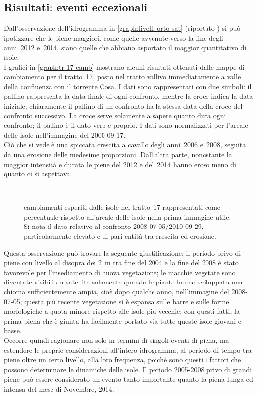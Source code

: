 \subsection{Risultati: eventi eccezionali}
Dall'osservazione dell'idrogramma in \vref{graph:livelli-orto-sat} (riportato ) si può ipotizzare che le piene maggiori, come quelle avvenute verso la fine degli anni~2012 e~2014, siano quelle che abbiano asportato il maggior quantitativo di isole.
\\
I grafici in \vref{graph:tr-17-camb} mostrano alcuni risultati ottenuti dalle mappe di cambiamento per il tratto~17, posto nel tratto vallivo immediatamente a valle della confluenza con il torrente Cosa.
I dati sono rappresentati con due simboli: il pallino rappresenta la data finale di ogni confronto, mentre la croce indica la data iniziale; 
chiaramente il pallino di un confronto ha la stessa data della croce del confronto successivo. 
La croce serve solamente a sapere quanto dura ogni confronto; il pallino è il dato vero e proprio.
I dati sono normalizzati per l'areale delle isole nell'immagine \AST{} del 2000-09-17.
\\
Ciò che si vede è una spiccata crescita a cavallo degli anni~2006 e~2008, seguita da una erosione delle medesime proporzioni.
Dall'altra parte, nonostante la maggior intensità e durata le piene del 2012 e del~2014 hanno eroso meno di quanto ci si aspettava.
%
\begin{figure}
	\centering
	
	\\
	
	\caption[cambiamenti esperiti dalle isole nel tratto~17]{cambiamenti esperiti dalle isole nel tratto~17 rappresentati come percentuale rispetto all'areale delle isole nella prima immagine utile. 
	Si nota il dato relativo al confronto 2008-07-05/2010-09-29, particolarmente elevato e di pari entità tra crescita ed erosione.}
	\label{graph:tr-17-camb}
\end{figure}
%
Questa osservazione può trovare la seguente giustificazione: il periodo privo di piene con livello al disopra dei \SI{2}{\m} tra fine del 2004 e la fine del 2008 è stato favorevole per l'insediamento di nuova vegetazione;
le macchie vegetate sono diventate visibili da satellite solamente quando le piante hanno sviluppato una chioma sufficientemente ampia, cioè dopo qualche anno, nell'immagine del 2008-07-05;
questa più recente vegetazione si è espansa sulle barre e sulle forme morfologiche a quota minore rispetto alle isole più vecchie;
con questi fatti, la prima piena che è giunta ha facilmente portato via tutte queste isole giovani e basse.
\\
Occorre quindi ragionare non solo in termini di singoli eventi di piena, ma estendere le proprie considerazioni all'intero idrogramma, al periodo di tempo tra piene oltre un certo livello, alla loro frequenza, poiché sono questi i fattori che possono determinare le dinamiche delle isole.
Il periodo 2005-2008 privo di grandi piene può essere considerato un evento tanto importante quanto la piena lunga ed intensa del mese di Novembre, 2014.

